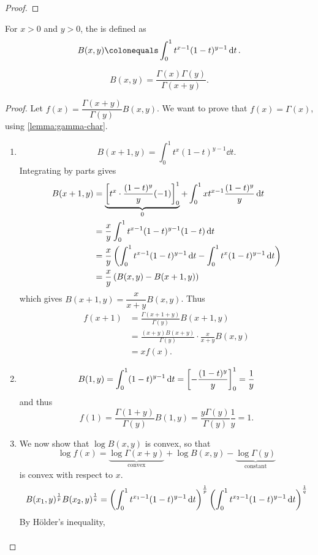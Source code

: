 \begin{proof}

\end{proof}

\begin{definition}
For $x>0$ and $y>0$, the  is defined as
\[B(x,y)\colonequals\int_0^1 t^{x-1}(1-t)^{y-1}\dd{t}.\]
\end{definition}

\begin{lemma}
\[B(x,y)=\frac{\Gamma(x)\Gamma(y)}{\Gamma(x+y)}.\]
\end{lemma}

\begin{proof}
Let $f(x)=\dfrac{\Gamma(x+y)}{\Gamma(y)}B(x,y)$. We want to prove that $f(x)=\Gamma(x)$, using \cref{lemma:gamma-char}.
\begin{enumerate}[label=(\roman*)]
\item \[B(x+1,y)=\int_0^1 t^x(1-t)^{y-1}\dd{t}.\]
Integrating by parts gives
\begin{align*}
B(x+1,y)&=\underbrace{\left[t^x\cdot\frac{(1-t)^y}{y}(-1)\right]_0^1}_{0}+\int_0^1 xt^{x-1}\frac{(1-t)^y}{y}\dd{t}\\
&=\frac{x}{y}\int_0^1 t^{x-1}(1-t)^{y-1}(1-t)\dd{t}\\
&=\frac{x}{y}\left(\int_0^1 t^{x-1}(1-t)^{y-1}\dd{t}-\int_0^1 t^x(1-t)^{y-1}\dd{t}\right)\\
&=\frac{x}{y}\left(B(x,y)-B(x+1,y)\right)
\end{align*}
which gives $B(x+1,y)=\dfrac{x}{x+y}B(x,y)$. Thus
\begin{align*}
f(x+1)&=\frac{\Gamma(x+1+y)}{\Gamma(y)}B(x+1,y)\\
&=\frac{(x+y)B(x+y)}{\Gamma(y)}\cdot\frac{x}{x+y}B(x,y)\\
&=xf(x).
\end{align*}
\item \[B(1,y)=\int_0^1(1-t)^{y-1}\dd{t}=\left[-\frac{(1-t)^y}{y}\right]_0^1=\frac{1}{y}\]
and thus
\[f(1)=\frac{\Gamma(1+y)}{\Gamma(y)}B(1,y)=\frac{y\Gamma(y)}{\Gamma(y)}\frac{1}{y}=1.\]
\item We now show that $\log B(x,y)$ is convex, so that
\[\log f(x)=\underbrace{\log\Gamma(x+y)}_\text{convex}+\log B(x,y)-\underbrace{\log\Gamma(y)}_\text{constant}\]
is convex with respect to $x$.
\[B(x_1,y)^\frac{1}{p}B(x_2,y)^\frac{1}{q}=\left(\int_0^1 t^{x_1-1}(1-t)^{y-1}\dd{t}\right)^\frac{1}{p}\left(\int_0^1 t^{x_2-1}(1-t)^{y-1}\dd{t}\right)^\frac{1}{q}\]
By H\"{o}lder's inequality,
\begin{align*}

\end{align*}
\end{enumerate}
\end{proof}
